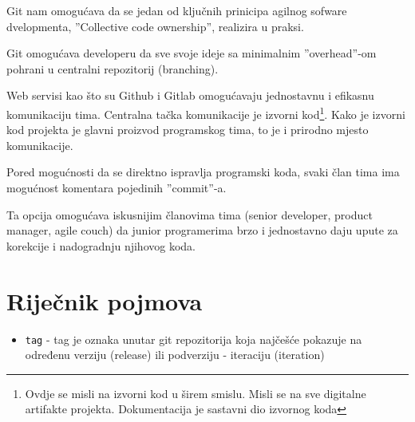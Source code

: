 \documentclass[times, utf8, seminar]{fit}
\begin{document}
\begin{itemize}
Git nam omogućava da se jedan od ključnih prinicipa agilnog sofware dvelopmenta, ''Collective code ownership'', realizira u praksi.

Git omogućava developeru da sve svoje ideje sa minimalnim ''overhead''-om pohrani u centralni repozitorij (branching).

Web servisi kao što su Github i Gitlab omogućavaju jednostavnu i efikasnu komunikaciju tima. Centralna tačka komunikacije je izvorni kod\footnote{Ovdje se misli na izvorni kod u širem smislu. Misli se na sve digitalne artifakte projekta. Dokumentacija je sastavni dio izvornog koda}.
Kako je izvorni kod projekta je glavni proizvod programskog tima, to je i prirodno mjesto komunikacije.

Pored mogućnosti da se direktno ispravlja programski koda, svaki član tima ima mogućnost komentara pojedinih ''commit''-a.

Ta opcija omogućava iskusnijim članovima tima (senior developer, product manager, agile couch) da junior programerima brzo i jednostavno daju upute za korekcije i nadogradnju njihovog koda.







\appendix

\chapter{Riječnik pojmova}

\begin{itemize}
    \item \texttt{tag} - tag je oznaka unutar git repozitorija koja najčešće pokazuje na određenu verziju (release) ili podverziju - iteraciju (iteration)


\end{itemize}
\end{itemize}
\end{document}
